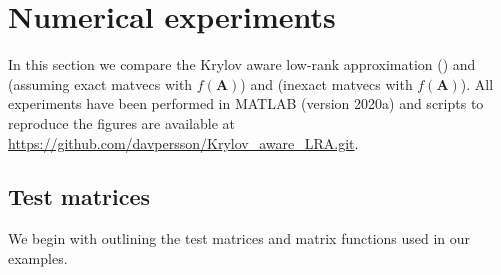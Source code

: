 \section{Numerical experiments}
\label{sec:experiments}
In this section we compare the Krylov aware low-rank approximation () and  (assuming exact matvecs with $f(\bm{A})$) and  (inexact matvecs with $f(\bm{A})$). All experiments have been performed in MATLAB (version 2020a) and scripts to reproduce the figures are available at \url{https://github.com/davpersson/Krylov_aware_LRA.git}.

\subsection{Test matrices}
We begin with outlining the test matrices and matrix functions used in our examples. 



